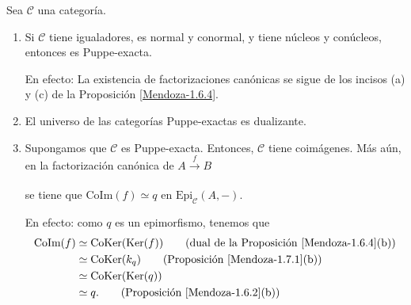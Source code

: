 \documentclass[tesis]{subfiles}
\begin{document}
\begin{Obs}\label{Mendoza-1.7.2}
    Sea $\mathscr{C}$ una categoría.

    \begin{enumerate}[label=(\arabic*)]
    
        \item Si $\mathscr{C}$ tiene igualadores, es normal y conormal, y tiene núcleos y conúcleos, entonces es Puppe-exacta.

            En efecto: La existencia de factorizaciones canónicas se sigue de los incisos (a) y (c) de la Proposición \ref{Mendoza-1.6.4}.

        \item El universo de las categorías Puppe-exactas es dualizante.

        \item Supongamos que $\mathscr{C}$ es Puppe-exacta. Entonces, $\mathscr{C}$ tiene coimágenes. Más aún, en la factorización canónica de $A\xrightarrow[]{f} B$
            \begin{center}
            \end{center}
            se tiene que $\text{CoIm}(f) \simeq q$ en $\text{Epi}_\mathscr{C}(A,-)$.

            En efecto: como $q$ es un epimorfismo, tenemos que
            \begin{align*}
                \text{CoIm}(f) &\simeq \text{CoKer}(\text{Ker}(f)) \tag{dual de la Proposición \ref{Mendoza-1.6.4}(b)} \\
                               &\simeq \text{CoKer}(k_q) \tag{Proposición \ref{Mendoza-1.7.1}(b)} \\
                               &\simeq \text{CoKer}(\text{Ker}(q)) \\
                               &\simeq q. \tag{Proposición \ref{Mendoza-1.6.2}(b)}
            \end{align*}
    \end{enumerate}
\end{Obs}
\end{document}
